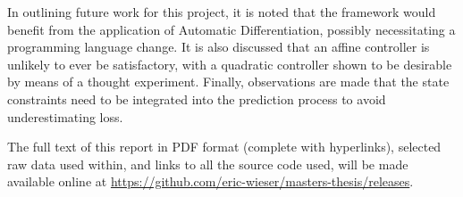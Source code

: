 \documentclass[main.tex]{subfiles}
\begin{document}
In outlining future work for this project, it is noted that the {\Pilco} framework would benefit from the application of Automatic Differentiation, possibly necessitating a programming language change.
It is also discussed that an affine controller is unlikely to ever be satisfactory, with a quadratic controller shown to be desirable by means of a thought experiment.
Finally, observations are made that the state constraints need to be integrated into the prediction process to avoid underestimating loss.

The full text of this report in PDF format (complete with hyperlinks), selected raw data used within, and links to all the source code used, will be made available online at \url{https://github.com/eric-wieser/masters-thesis/releases}.
\end{document}
